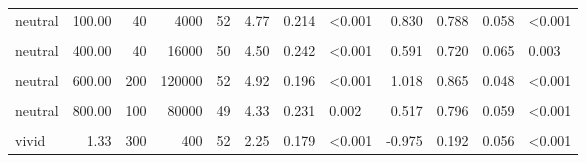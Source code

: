 \documentclass[
]{article}
\begin{document}
\begin{longtable}[t]{lrrrrrrlrrrl}
\hspace{1em}neutral & 100.00 & 40 & 4000 & 52 & 4.77 & 0.214 & <0.001 & 0.830 & 0.788 & 0.058 & <0.001\\
\hspace{1em}\cellcolor{gray!10}{neutral} & \cellcolor{gray!10}{400.00} & \cellcolor{gray!10}{10} & \cellcolor{gray!10}{4000} & \cellcolor{gray!10}{52} & \cellcolor{gray!10}{5.10} & \cellcolor{gray!10}{0.169} & \cellcolor{gray!10}{<0.001} & \cellcolor{gray!10}{1.320} & \cellcolor{gray!10}{0.923} & \cellcolor{gray!10}{0.038} & \cellcolor{gray!10}{<0.001}\\
\hspace{1em}neutral & 400.00 & 40 & 16000 & 50 & 4.50 & 0.242 & <0.001 & 0.591 & 0.720 & 0.065 & 0.003\\
\hspace{1em}\cellcolor{gray!10}{neutral} & \cellcolor{gray!10}{600.00} & \cellcolor{gray!10}{20} & \cellcolor{gray!10}{12000} & \cellcolor{gray!10}{49} & \cellcolor{gray!10}{4.45} & \cellcolor{gray!10}{0.254} & \cellcolor{gray!10}{0.002} & \cellcolor{gray!10}{0.540} & \cellcolor{gray!10}{0.776} & \cellcolor{gray!10}{0.061} & \cellcolor{gray!10}{<0.001}\\
\hspace{1em}neutral & 600.00 & 200 & 120000 & 52 & 4.92 & 0.196 & <0.001 & 1.018 & 0.865 & 0.048 & <0.001\\
\hspace{1em}\cellcolor{gray!10}{neutral} & \cellcolor{gray!10}{800.00} & \cellcolor{gray!10}{30} & \cellcolor{gray!10}{24000} & \cellcolor{gray!10}{52} & \cellcolor{gray!10}{5.06} & \cellcolor{gray!10}{0.193} & \cellcolor{gray!10}{<0.001} & \cellcolor{gray!10}{1.130} & \cellcolor{gray!10}{0.904} & \cellcolor{gray!10}{0.042} & \cellcolor{gray!10}{<0.001}\\
\hspace{1em}neutral & 800.00 & 100 & 80000 & 49 & 4.33 & 0.231 & 0.002 & 0.517 & 0.796 & 0.059 & <0.001\\
\hspace{1em}\cellcolor{gray!10}{vivid} & \cellcolor{gray!10}{1.33} & \cellcolor{gray!10}{30} & \cellcolor{gray!10}{40} & \cellcolor{gray!10}{50} & \cellcolor{gray!10}{2.08} & \cellcolor{gray!10}{0.144} & \cellcolor{gray!10}{<0.001} & \cellcolor{gray!10}{-1.410} & \cellcolor{gray!10}{0.100} & \cellcolor{gray!10}{0.043} & \cellcolor{gray!10}{<0.001}\\
\hspace{1em}vivid & 1.33 & 300 & 400 & 52 & 2.25 & 0.179 & <0.001 & -0.975 & 0.192 & 0.056 & <0.001\\

\end{longtable}
\end{document}
